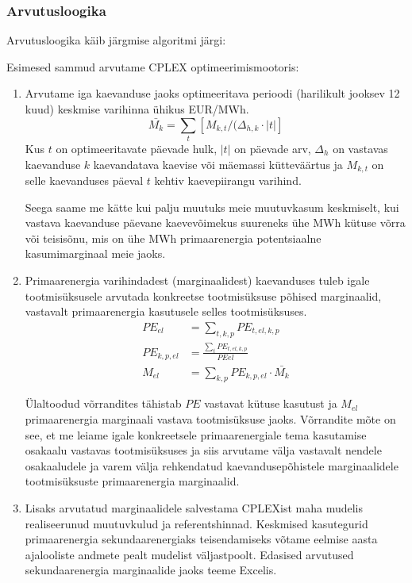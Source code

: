 \documentclass[10pt,a4paper]{article}
\begin{document}
\subsubsection{Arvutusloogika}

Arvutusloogika käib järgmise algoritmi järgi:

Esimesed sammud arvutame CPLEX optimeerimismootoris:
\begin{enumerate}
\item Arvutame iga kaevanduse jaoks optimeeritava perioodi (harilikult jooksev 12 kuud) keskmise varihinna ühikus EUR/MWh. 
\begin{equation}
\bar{M_k} = \sum_t [M_{k,t} / (\Delta_{h,k} \cdot |t|]
\end{equation}
Kus $t$ on optimeeritavate päevade hulk, $|t|$ on päevade arv, $\Delta_h$ on vastavas kaevanduse $k$ kaevandatava kaevise või mäemassi kütteväärtus ja $M_{k,t}$ on selle kaevanduses päeval $t$ kehtiv kaevepiirangu varihind.

Seega saame me kätte kui palju muutuks meie muutuvkasum keskmiselt, kui vastava kaevanduse päevane kaevevõimekus suureneks ühe MWh kütuse võrra või teisisõnu, mis on ühe MWh primaarenergia potentsiaalne kasumimarginaal meie jaoks.

\item Primaarenergia varihindadest (marginaalidest) kaevanduses tuleb igale tootmisüksusele arvutada konkreetse tootmisüksuse põhised marginaalid, vastavalt primaarenergia kasutusele selles tootmisüksuses. 
\begin{align}
PE_{el} &= \sum_{t,k,p} PE_{t,el,k,p} \\
PE_{k,p,el} &= \frac{\sum_{t} PE_{t,el,k,p}}{PE{el}} \\
M_{el} &= \sum_{k,p} PE_{k,p,el} \cdot \bar{M_k} 
\end{align}

Ülaltoodud võrrandites tähistab $PE$ vastavat kütuse kasutust ja $M_{el}$ primaarenergia marginaali vastava tootmisüksuse jaoks. Võrrandite mõte on see, et me leiame igale konkreetsele primaarenergiale tema kasutamise osakaalu vastavas tootmisüksuses ja siis arvutame välja vastavalt nendele osakaaludele ja varem välja rehkendatud kaevandusepõhistele marginaalidele tootmisüksuste primaarenergia marginaalid.

\item Lisaks arvutatud marginaalidele salvestama CPLEXist maha mudelis realiseerunud muutuvkulud ja referentshinnad. Keskmised kasutegurid primaarenergia sekundaarenergiaks teisendamiseks võtame eelmise aasta ajalooliste andmete pealt mudelist väljastpoolt. Edasised arvutused sekundaarenergia marginaalide jaoks teeme Excelis.


\end{enumerate}
\end{document}
